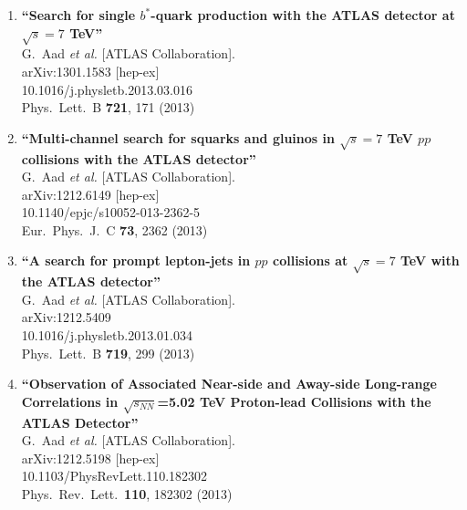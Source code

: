 \documentclass{article}
\begin{document}
\begin{enumerate}
\item%
{\bf ``Search for single $b^*$-quark production with the ATLAS detector at $\sqrt{s}=7$ TeV''}
  \\{}G.~Aad {\it et al.}  [ATLAS Collaboration].
  \\{}arXiv:1301.1583 [hep-ex]
    \\{}10.1016/j.physletb.2013.03.016
\\{}Phys.\ Lett.\ B {\bf 721}, 171 (2013) %


\item%
{\bf ``Multi-channel search for squarks and gluinos in $\sqrt{s}=7$ TeV $pp$ collisions with the ATLAS detector''}
  \\{}G.~Aad {\it et al.}  [ATLAS Collaboration].
  \\{}arXiv:1212.6149 [hep-ex]
    \\{}10.1140/epjc/s10052-013-2362-5
\\{}Eur.\ Phys.\ J.\ C {\bf 73}, 2362 (2013) %


\item%
{\bf ``A search for prompt lepton-jets in $pp$ collisions at $\sqrt{s}=7$ TeV with the ATLAS detector''}
  \\{}G.~Aad {\it et al.}  [ATLAS Collaboration].
  \\{}arXiv:1212.5409
    \\{}10.1016/j.physletb.2013.01.034
\\{}Phys.\ Lett.\ B {\bf 719}, 299 (2013) %


\item%
{\bf ``Observation of Associated Near-side and Away-side Long-range Correlations in $\sqrt{s_{NN}}$=5.02 TeV Proton-lead Collisions with the ATLAS Detector''}
  \\{}G.~Aad {\it et al.}  [ATLAS Collaboration].
  \\{}arXiv:1212.5198 [hep-ex]
    \\{}10.1103/PhysRevLett.110.182302
\\{}Phys.\ Rev.\ Lett.\  {\bf 110}, 182302 (2013) %



\end{enumerate}
\end{document}
